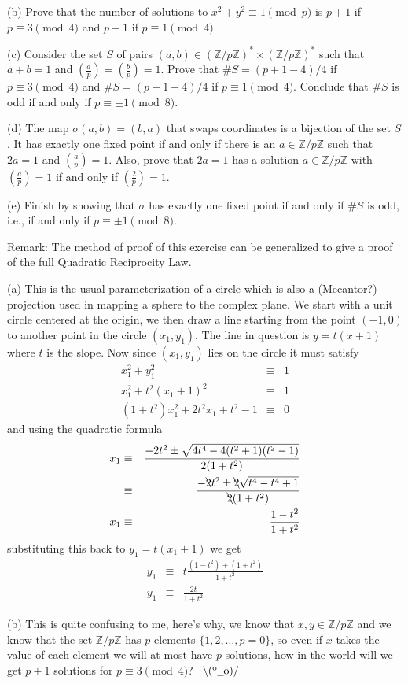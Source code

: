 \documentclass[aps,preprint,preprintnumbers,nofootinbib,showpacs,prd]{revtex4-1}
\newcommand{\nbea}{\begin{eqnarray*}}
\newcommand{\neea}{\end{eqnarray*}}
\newcommand{\dunno}{$ {}^{\mbox {--}}\backslash(^{\rm o}{}\underline{\hspace{0.2cm}}{\rm o})/^{\mbox {--}}$}
\begin{document}
(b) Prove that the number of solutions to $x^2 + y^2 \equiv 1 \pmod {p}$ is $p + 1$ if $p \equiv 3 \pmod {4}$ and $p-1$ if $p \equiv 1 \pmod {4}$.

(c) Consider the set $S$ of pairs $(a,b) \in (\mathbb{Z}/p\mathbb{Z})^*\times(\mathbb{Z}/p\mathbb{Z})^*$ such that $a + b = 1$ and $\left (\frac{a} {p} \right )=\left ( \frac{b} {p} \right )= 1$. Prove that $\#S = (p + 1-4)/4$ if $p \equiv 3 \pmod {4}$ and $\#S = (p - 1 - 4)/4$ if $p \equiv 1 \pmod 4$. Conclude that $\#S$ is odd if and only if $p \equiv \pm1 \pmod {8}$.

(d) The map $\sigma(a,b) = (b,a)$ that swaps coordinates is a bijection of the set $S$. It has exactly one fixed point if and only if there is an $a \in \mathbb{Z}/p\mathbb{Z}$ such that $2a = 1$ and $\left (\frac{a} {p} \right )= 1$. Also, prove that $2a = 1$ has a solution $a \in \mathbb{Z}/p\mathbb{Z}$ with $\left (\frac{a} {p} \right )= 1$ if and only if $\left (\frac{2} {p} \right )= 1$.

(e) Finish by showing that $\sigma$ has exactly one fixed point if and only if $\#S$ is odd, i.e., if and only if $p \equiv \pm 1 \pmod {8}$.

Remark: The method of proof of this exercise can be generalized to give a proof of the full Quadratic Reciprocity Law.

(a) This is the usual parameterization of a circle which is also a (Mecantor?) projection used in mapping a sphere to the complex plane. We start with a unit circle centered at the origin, we then draw a line starting from the point $(-1,0)$ to another point in the circle $(x_1,y_1)$. The line in question is $y = t(x+1)$ where $t$ is the slope. Now since $(x_1,y_1)$ lies on the circle it must satisfy
%
\nbea
x^2_1 + y^2_1 & \equiv & 1 \\
x^2_1 + t^2(x_1 + 1)^2 & \equiv & 1 \\
(1 + t^2)x^2_1 + 2 t^2 x_1 +t^2 - 1 & \equiv & 0
\neea
%
and using the quadratic formula
%
\nbea
x_1 & \equiv & \frac{-2t^2 \pm \sqrt{4t^4 - 4(t^2+1)(t^2-1)}}{2(1+t^2)} \\
& \equiv & \frac{-\bcancel{2}t^2 \pm \bcancel{2}\sqrt{t^4 - t^4+1}}{\bcancel{2}(1+t^2)} \\
x_1 & \equiv & \frac{1-t^2}{1+t^2}
\neea
%
substituting this back to $y_1 = t(x_1+1)$ we get
%
\nbea
y_1 & \equiv & t \frac{(1-t^2) + (1+t^2)}{1+t^2} \\
y_1 & \equiv & \frac{2t}{1+t^2}
\neea
%

(b) This is quite confusing to me, here's why, we know that $x,y \in \mathbb{Z}/p\mathbb{Z}$ and we know that the set $\mathbb{Z}/p\mathbb{Z}$ has $p$ elements $\{1,2,\dots,p=0\}$, so even if $x$ takes the value of each element we will at most have $p$ solutions, how in the world will we get $p+1$ solutions for $p \equiv 3 \pmod{4}$? \dunno
\end{document}
